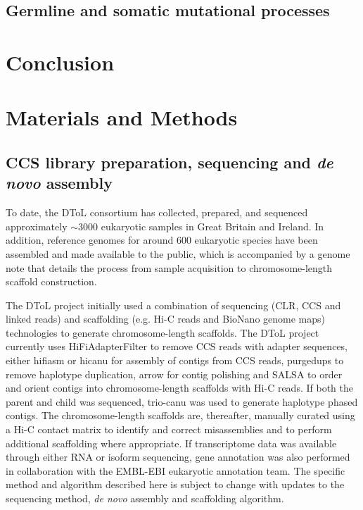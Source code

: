 \subsection{Germline and somatic mutational processes}

\section{Conclusion}



\section{Materials and Methods}

\subsection{CCS library preparation, sequencing and \textit{de novo} assembly}

To date, the DToL consortium has collected, prepared, and sequenced approximately $\sim$3000 eukaryotic samples in Great Britain and Ireland. In addition, reference genomes for around 600 eukaryotic species have been assembled and made available to the public, which is accompanied by a genome note that details the process from sample acquisition to chromosome-length scaffold construction. 

The DToL project initially used a combination of sequencing (CLR, CCS and linked reads) and scaffolding (e.g. Hi-C reads and BioNano genome maps) technologies to generate chromosome-length scaffolds. The DToL project currently uses HiFiAdapterFilter \cite{} to remove CCS reads with adapter sequences, either hifiasm \cite{} or hicanu \cite{} for  assembly of contigs from CCS reads, purgedups \cite{} to remove haplotype duplication, arrow \cite{} for contig polishing and SALSA \cite{} to order and orient contigs into chromosome-length scaffolds with Hi-C reads. If both the parent and child was sequenced, trio-canu was used to generate haplotype phased contigs. The chromosome-length scaffolds are, thereafter, manually curated using a Hi-C contact matrix to identify and correct misassemblies and to perform additional scaffolding where appropriate. If transcriptome data was available through either RNA or isoform sequencing, gene annotation was also performed in collaboration with the EMBL-EBI eukaryotic annotation team. The specific method and algorithm described here is subject to change with updates to the sequencing method, \textit{de novo} assembly and scaffolding algorithm. 

